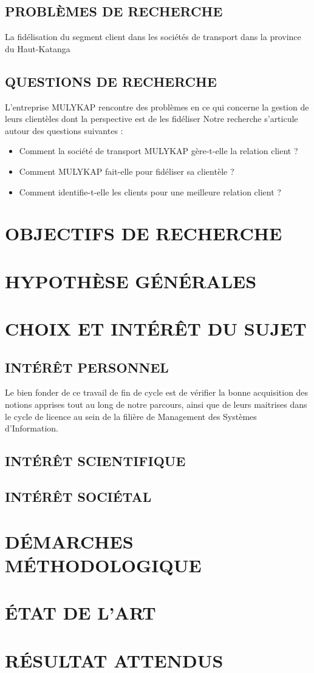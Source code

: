 \documentclass[a4paper,12pt,oneside]{book}
\begin{document}
\subsection[Problèmes de recherche]{PROBLÈMES DE RECHERCHE}
La fidélisation du segment client dans les sociétés de transport
dans la province du Haut-Katanga
\subsection[Questions de recherche]{QUESTIONS DE RECHERCHE}
L’entreprise MULYKAP rencontre des problèmes en ce qui concerne
la gestion de leurs clientèles dont la perspective est de les 
fidéliser 
Notre recherche s’articule autour des questions suivantes : 
\begin{itemize}
    \item Comment la société de transport MULYKAP gère-t-elle
    la relation client ?
    \item Comment MULYKAP fait-elle pour fidéliser sa clientèle ?
    \item Comment identifie-t-elle les clients pour une
    meilleure relation client ?
\end{itemize}
\section[Objectifs de recherche]{OBJECTIFS DE RECHERCHE}
\section[Hyposthèses générales]{HYPOTHÈSE GÉNÉRALES}
\section[Choix et interet du sujet]{CHOIX ET INTÉRÊT DU SUJET}
\subsection[short]{INTÉRÊT PERSONNEL}
Le bien fonder de ce travail de fin de cycle est de
vérifier la bonne acquisition des notions apprises tout
au long de notre parcours, ainsi que de leurs maitrises
dans le cycle de licence au sein de la filière de Management
des Systèmes d’Information.

\subsection[short]{INTÉRÊT SCIENTIFIQUE}

\subsection[short]{INTÉRÊT SOCIÉTAL}

\section[Démarches méthodologiques]{DÉMARCHES MÉTHODOLOGIQUE}

\section[Etat de l'art]{ÉTAT DE L’ART}

\section[Résultats attenus]{RÉSULTAT ATTENDUS}

\printbibliography
\end{document}

